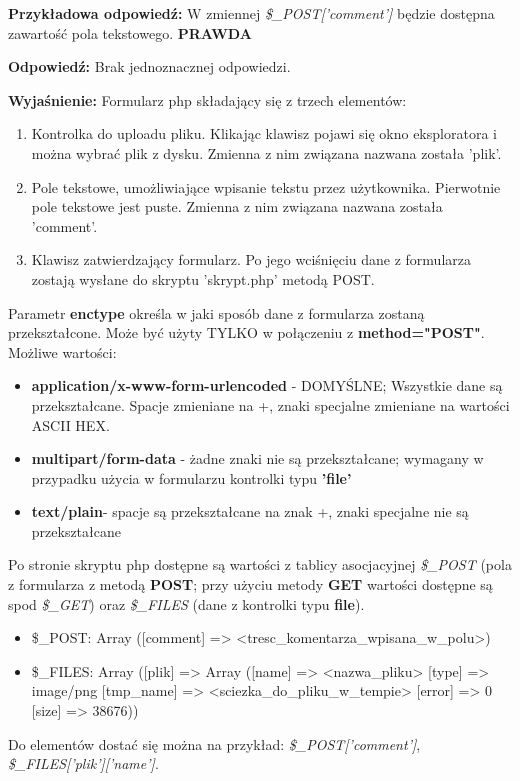 \noindent
{\textbf{Przykładowa odpowiedź:}}
W zmiennej \textit{\$\_POST['comment']} będzie dostępna zawartość pola tekstowego.
\textbf{PRAWDA}

\vspace{0.4cm}
\noindent
\textbf{Odpowiedź:}
Brak jednoznacznej odpowiedzi.

\vspace{0.4cm}
\noindent
\textbf{Wyjaśnienie:}
Formularz php składający się z trzech elementów:
\begin{enumerate}
\item
Kontrolka do uploadu pliku. Klikając klawisz pojawi się okno eksploratora i można wybrać plik z dysku. Zmienna z nim związana nazwana została 'plik'.
\item
Pole tekstowe, umożliwiające wpisanie tekstu przez użytkownika. Pierwotnie pole tekstowe jest puste. Zmienna z nim związana nazwana została 'comment'.
\item
Klawisz zatwierdzający formularz. Po jego wciśnięciu dane z formularza zostają wysłane do skryptu 'skrypt.php' metodą POST.
\end{enumerate}

Parametr \textbf{enctype} określa w jaki sposób dane z formularza zostaną przekształcone. Może być użyty TYLKO w połączeniu z \textbf{method="POST"}.
	Możliwe wartości:
\begin{itemize}
\item
\textbf{application/x-www-form-urlencoded} - DOMYŚLNE; Wszystkie dane są przekształcane. Spacje zmieniane na +, znaki specjalne zmieniane na wartości ASCII HEX.
\item
\textbf{multipart/form-data} - żadne znaki nie są przekształcane; wymagany w przypadku użycia w formularzu kontrolki typu \textbf{'file'}
\item
\textbf{text/plain}- spacje są przekształcane na znak +, znaki specjalne nie są przekształcane
\end{itemize}

Po stronie skryptu php dostępne są wartości z tablicy asocjacyjnej \textit{\$\_POST} (pola z formularza z metodą \textbf{POST}; przy użyciu metody \textbf{GET} wartości dostępne są spod \textit{\$\_GET}) oraz \textit{\$\_FILES} (dane z kontrolki typu \textbf{file}).

\begin{itemize}
\item
\$\_POST: Array ([comment] => <tresc\_komentarza\_wpisana\_w\_polu>)
\item
\$\_FILES: Array ([plik] => Array ([name] => <nazwa\_pliku> [type] => image/png [tmp\_name] => <sciezka\_do\_pliku\_w\_tempie> [error] => 0 [size] => 38676))
\end{itemize}
Do elementów dostać się można na przykład: \textit{\$\_POST['comment']}, \textit{\$\_FILES['plik']['name']}.

